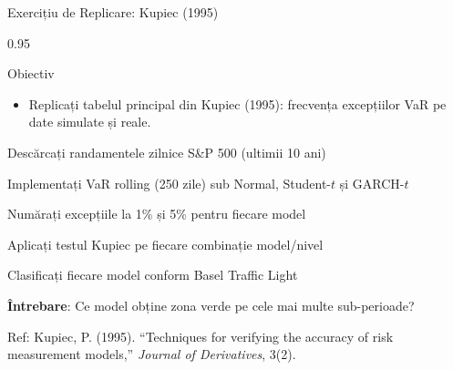 \documentclass[9pt, aspectratio=169, t]{beamer}
\begin{document}
\begin{frame}{Exercițiu de Replicare: Kupiec (1995)}
    \begin{cminipage}{0.95\textwidth}
        \begin{block}{Obiectiv}
            \begin{itemize}\setlength{\itemsep}{0pt}
                \item Replicați tabelul principal din Kupiec (1995): frecvența excepțiilor VaR pe date simulate și reale.
            \end{itemize}
        \end{block}
        \begin{enumerate}\setlength{\itemsep}{2pt}
            {\small
            \item Descărcați randamentele zilnice S\&P 500 (ultimii 10 ani)
            \item Implementați VaR rolling (250 zile) sub Normal, Student-$t$ și GARCH-$t$
            \item Numărați excepțiile la 1\% și 5\% pentru fiecare model
            \item Aplicați testul Kupiec pe fiecare combinație model/nivel
            \item Clasificați fiecare model conform Basel Traffic Light
            \item \textbf{Întrebare}: Ce model obține zona \textcolor{Forest}{verde} pe cele mai multe sub-perioade?
            }
        \end{enumerate}
        {\tiny Ref: Kupiec, P. (1995). ``Techniques for verifying the accuracy of risk measurement models,'' \textit{Journal of Derivatives}, 3(2).}
    \end{cminipage}
\end{frame}
\end{document}
